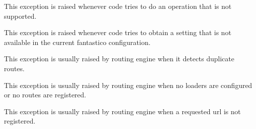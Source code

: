 \documentclass[letterpaper,10pt,english]{sphinxmanual}
\begin{document}

\begin{fulllineitems}
\label{features/exceptions:fantastico.exceptions.FantasticoNotSupportedError}
This exception is raised whenever code tries to do an operation that is  not supported.

\end{fulllineitems}


\begin{fulllineitems}
\label{features/exceptions:fantastico.exceptions.FantasticoSettingNotFoundError}
This exception is raised whenever code tries to obtain a setting that is not available in the current fantastico
configuration.

\end{fulllineitems}


\begin{fulllineitems}
\label{features/exceptions:fantastico.exceptions.FantasticoDuplicateRouteError}
This exception is usually raised by routing engine when it detects duplicate routes.

\end{fulllineitems}


\begin{fulllineitems}
\label{features/exceptions:fantastico.exceptions.FantasticoNoRoutesError}
This exception is usually raised by routing engine when no loaders are configured or no routes are registered.

\end{fulllineitems}


\begin{fulllineitems}
\label{features/exceptions:fantastico.exceptions.FantasticoRouteNotFoundError}
This exception is usually raised by routing engine when a requested url is not registered.

\end{fulllineitems}
\end{document}
